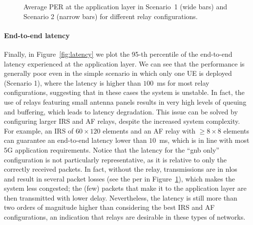 \begin{figure}[t!]
	\centering
	\setlength{}
	\setlength{}
	
	\caption{Average PER at the application layer in Scenario~1 (wide bars) and Scenario 2 (narrow bars) for different relay configurations.}
	\label{fig:per}
\end{figure}

\paragraph{End-to-end latency}

Finally, in Figure~\ref{fig:latency} we plot the 95-th percentile of the end-to-end latency experienced at the application layer.
 We can see that the performance is generally poor even in the simple scenario in which only one UE is deployed (Scenario 1), where the latency is higher than $100$~ms for most relay configurations, suggesting that in these cases the system is unstable. In fact, the use of relays featuring small antenna panels results in very high levels of queuing and buffering, which leads to latency degradation. This issue can be solved by configuring larger IRS and AF relays, despite the increased system complexity. 
 For example, an IRS of $60\times120$ elements and an AF relay with $\geq 8\times8$ elements can guarantee an end-to-end latency lower than $10$~ms, which is in line with most 5G application requirements. 
 Notice that the latency for the ``\gls{gnb} only'' configuration is not particularly representative, as it is relative to only the correctly received packets.
 In fact, without the relay, transmissions are in \gls{nlos} and result in several packet losses (see the \gls{per} in Figure~\ref{fig:per}), which makes the system less congested; the (few) packets that make it to the application layer are then transmitted with lower delay. Nevertheless, the latency is still more than two orders of magnitude higher than considering the best IRS and AF configurations, an indication that relays are desirable in these types of networks.


